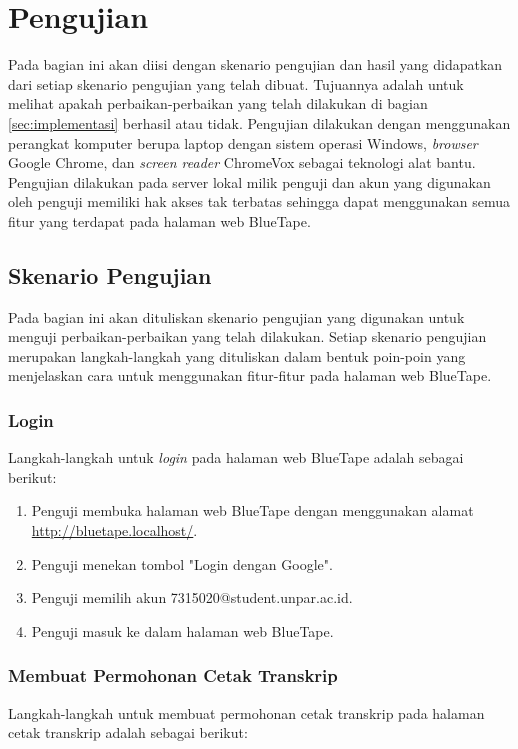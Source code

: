 \section{Pengujian}
\label{sec:pengujian}
Pada bagian ini akan diisi dengan skenario pengujian dan hasil yang didapatkan dari setiap skenario pengujian yang telah dibuat. Tujuannya adalah untuk melihat apakah perbaikan-perbaikan yang telah dilakukan di bagian \ref{sec:implementasi} berhasil atau tidak. Pengujian dilakukan dengan menggunakan perangkat komputer berupa laptop dengan sistem operasi Windows, \textit{browser} Google Chrome, dan \textit{screen reader} ChromeVox sebagai teknologi alat bantu. Pengujian dilakukan pada server lokal milik penguji dan akun yang digunakan oleh penguji memiliki hak akses tak terbatas sehingga dapat menggunakan semua fitur yang terdapat pada halaman web BlueTape.

\subsection{Skenario Pengujian}
\label{subsec:skenario_pengujian}
Pada bagian ini akan dituliskan skenario pengujian yang digunakan untuk menguji perbaikan-perbaikan yang telah dilakukan. Setiap skenario pengujian merupakan langkah-langkah yang dituliskan dalam bentuk poin-poin yang menjelaskan cara untuk menggunakan fitur-fitur pada halaman web BlueTape.

\subsubsection{Login}
\label{subsubsec:skenario_login}
Langkah-langkah untuk \textit{login} pada halaman web BlueTape adalah sebagai berikut:

\begin{enumerate}
    \item Penguji membuka halaman web BlueTape dengan menggunakan alamat \url{http://bluetape.localhost/}.
    \item Penguji menekan tombol "Login dengan Google".
    \item Penguji memilih akun 7315020@student.unpar.ac.id.
    \item Penguji masuk ke dalam halaman web BlueTape.
\end{enumerate}

\subsubsection{Membuat Permohonan Cetak Transkrip}
\label{subsubsec:skenario_membuat_permohonan_cetak_transkrip}
Langkah-langkah untuk membuat permohonan cetak transkrip pada halaman cetak transkrip adalah sebagai berikut:


